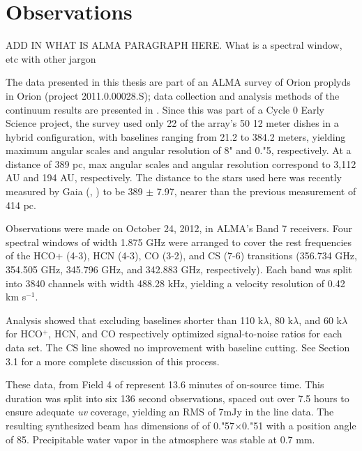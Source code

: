 \chapter{Observations}
\label{chap:observations}

ADD IN WHAT IS ALMA PARAGRAPH HERE. What is a spectral window, etc with other jargon



The data presented in this thesis are part of an ALMA survey of Orion proplyds in Orion (project 2011.0.00028.S); data collection and analysis methods of the continuum results are presented in \citet{mann_alma_2014}. Since this was part of a Cycle 0 Early Science project, the survey used only 22 of the array's 50 12 meter dishes in a hybrid configuration, with baselines ranging from 21.2 to 384.2 meters, yielding maximum angular scales and angular resolution of 8" and 0."5, respectively. At a distance of 389 pc, max angular scales and angular resolution correspond to 3,112 AU and 194 AU, respectively. The distance to the stars used here was recently measured by Gaia (\citet{gaia_collaboration_gaia_2016}, \citet{gaia_collaboration_gaia_2018}) to be 389 $\pm$ 7.97, nearer than the previous measurement of 414 pc.
\bigskip

Observations were made on October 24, 2012, in ALMA's Band 7 receivers. Four spectral windows of width 1.875 GHz were arranged to cover the rest frequencies of the HCO+ (4-3), HCN (4-3), CO (3-2), and CS (7-6) transitions (356.734 GHz, 354.505 GHz, 345.796 GHz, and 342.883 GHz, respectively). Each band was split into 3840 channels with width 488.28 kHz, yielding a velocity resolution of 0.42 km s$^{-1}$.

\bigskip


Analysis showed that excluding baselines shorter than 110 k$\lambda$, 80 k$\lambda$, and 60 k$\lambda$ for HCO$^{+}$, HCN, and CO respectively optimized signal-to-noise ratios for each data set. The CS line showed no improvement with baseline cutting. See Section 3.1 for a more complete discussion of this process.


These data, from Field 4 of \citet{mann_alma_2014} represent 13.6 minutes of on-source time. This duration was split into six 136 second observations, spaced out over 7.5 hours to ensure adequate \textit{uv} coverage, yielding an RMS of 7mJy in the line data. The resulting synthesized beam has dimensions of of 0."57$\times$0."51 with a position angle of 85\degree. Precipitable water vapor in the atmosphere was stable at 0.7 mm.


